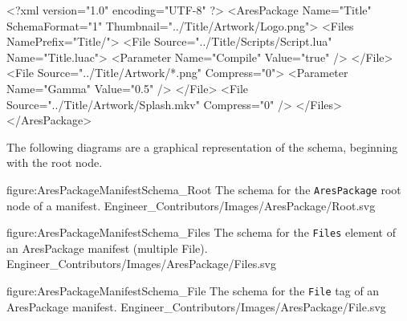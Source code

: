 \startCodeExample
<?xml version="1.0" encoding="UTF-8" ?>
<AresPackage Name="Title" SchemaFormat="1" Thumbnail="../Title/Artwork/Logo.png">
    <Files NamePrefix="Title/">
        <File Source="../Title/Scripts/Script.lua" Name="Title.luac">
            <Parameter Name="Compile" Value="true" />
        </File>
        <File Source="../Title/Artwork/*.png" Compress="0">
            <Parameter Name="Gamma" Value="0.5" />
        </File>
        <File Source="../Title/Artwork/Splash.mkv" Compress="0" />
    </Files>
</AresPackage>
\stopCodeExample

The following diagrams are a graphical representation of the schema, beginning with the root node.

\FullPageDiagram
    {figure:AresPackageManifestSchema_Root}
    {The schema for the {\tt AresPackage} root node of a manifest.}
    {Engineer_Contributors/Images/AresPackage/Root.svg}

\FullPageDiagram
    {figure:AresPackageManifestSchema_Files}
    {The schema for the {\tt Files} element of an AresPackage manifest (multiple File).}
    {Engineer_Contributors/Images/AresPackage/Files.svg}

\FullPageDiagram
    {figure:AresPackageManifestSchema_File}
    {The schema for the {\tt File} tag of an AresPackage manifest.}
    {Engineer_Contributors/Images/AresPackage/File.svg}

